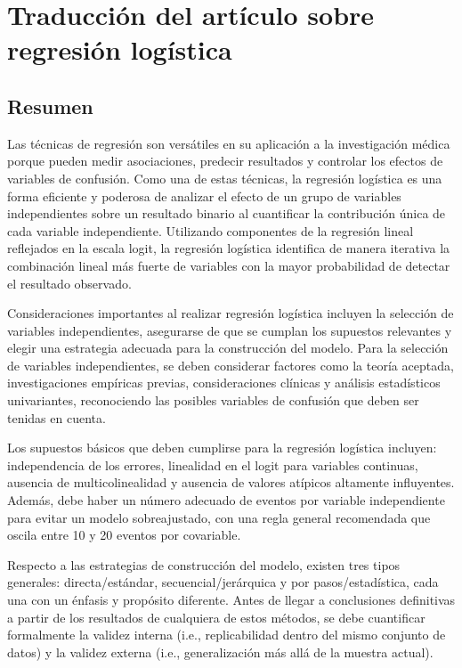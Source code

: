 \section{Traducción del artículo sobre regresión logística}

\subsection{Resumen}

Las técnicas de regresión son versátiles en su aplicación a la investigación médica porque pueden medir asociaciones, predecir resultados y controlar los efectos de variables de confusión. Como una de estas técnicas, la regresión logística es una forma eficiente y poderosa de analizar el efecto de un grupo de variables independientes sobre un resultado binario al cuantificar la contribución única de cada variable independiente. Utilizando componentes de la regresión lineal reflejados en la escala logit, la regresión logística identifica de manera iterativa la combinación lineal más fuerte de variables con la mayor probabilidad de detectar el resultado observado. 

Consideraciones importantes al realizar regresión logística incluyen la selección de variables independientes, asegurarse de que se cumplan los supuestos relevantes y elegir una estrategia adecuada para la construcción del modelo. Para la selección de variables independientes, se deben considerar factores como la teoría aceptada, investigaciones empíricas previas, consideraciones clínicas y análisis estadísticos univariantes, reconociendo las posibles variables de confusión que deben ser tenidas en cuenta.

Los supuestos básicos que deben cumplirse para la regresión logística incluyen: independencia de los errores, linealidad en el logit para variables continuas, ausencia de multicolinealidad y ausencia de valores atípicos altamente influyentes. Además, debe haber un número adecuado de eventos por variable independiente para evitar un modelo sobreajustado, con una regla general recomendada que oscila entre 10 y 20 eventos por covariable.

Respecto a las estrategias de construcción del modelo, existen tres tipos generales: directa/estándar, secuencial/jerárquica y por pasos/estadística, cada una con un énfasis y propósito diferente. Antes de llegar a conclusiones definitivas a partir de los resultados de cualquiera de estos métodos, se debe cuantificar formalmente la validez interna (i.e., replicabilidad dentro del mismo conjunto de datos) y la validez externa (i.e., generalización más allá de la muestra actual).

